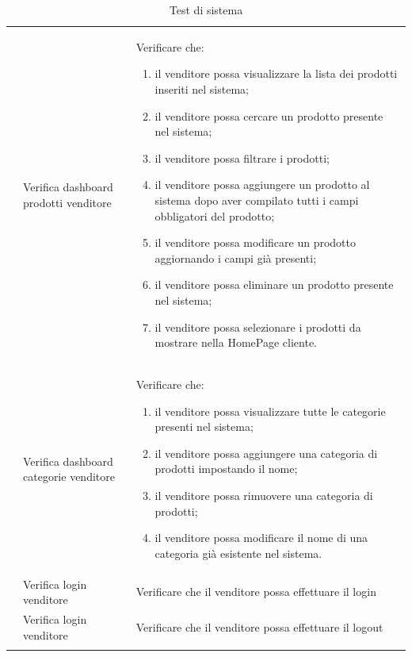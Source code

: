 \begin{center}
\begin{longtable}{|p{1cm}|p{4.85cm}|p{9cm}|}
		 & Verifica dashboard prodotti venditore & Verificare che:
		\begin{enumerate}
			\item il venditore possa visualizzare la lista dei prodotti inseriti nel sistema;
			\item il venditore possa cercare un prodotto presente nel sistema;
			\item il venditore possa filtrare i prodotti;
			\item il venditore possa aggiungere un prodotto al sistema dopo aver compilato tutti i campi obbligatori del prodotto;
			\item il venditore possa modificare un prodotto aggiornando i campi già presenti;
			\item il venditore possa eliminare un prodotto presente nel sistema;
			\item il venditore possa selezionare i prodotti da mostrare nella HomePage cliente.
		\end{enumerate} \\

		 & Verifica dashboard categorie venditore & Verificare che:
		\begin{enumerate}
			\item il venditore possa visualizzare tutte le categorie presenti nel sistema;
			\item il venditore possa aggiungere una categoria di prodotti impostando il nome;
			\item il venditore possa rimuovere una categoria di prodotti;
			\item il venditore possa modificare il nome di una categoria già esistente nel sistema.
		\end{enumerate} \\

		 & Verifica login venditore & Verificare che il venditore possa effettuare il login \\

		 & Verifica login venditore & Verificare che il venditore possa effettuare il logout \\

		\hline
		\caption{Test di sistema}
	\end{longtable}
\end{center}



